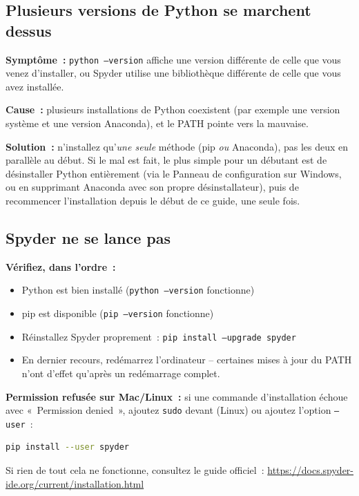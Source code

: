 \documentclass[12pt,a4paper]{article}
\begin{document}
	\subsection{Plusieurs versions de Python se marchent dessus}
	
	\textbf{Symptôme~:} \texttt{python --version} affiche une version différente de celle que vous venez d'installer, ou Spyder utilise une bibliothèque différente de celle que vous avez installée.
	
	\textbf{Cause~:} plusieurs installations de Python coexistent (par exemple une version système et une version Anaconda), et le PATH pointe vers la mauvaise.
	
	\textbf{Solution~:} n'installez qu'\emph{une seule} méthode (pip \emph{ou} Anaconda), pas les deux en parallèle au début. Si le mal est fait, le plus simple pour un débutant est de désinstaller Python entièrement (via le Panneau de configuration sur Windows, ou en supprimant Anaconda avec son propre désinstallateur), puis de recommencer l'installation depuis le début de ce guide, une seule fois.
	
	\subsection{Spyder ne se lance pas}
	
	\textbf{Vérifiez, dans l'ordre~:}
	\begin{itemize}
		\item Python est bien installé (\texttt{python --version} fonctionne)
		\item pip est disponible (\texttt{pip --version} fonctionne)
		\item Réinstallez Spyder proprement~: \texttt{pip install --upgrade spyder}
		\item En dernier recours, redémarrez l'ordinateur -- certaines mises à jour du PATH n'ont d'effet qu'après un redémarrage complet.
	\end{itemize}
	
	\textbf{Permission refusée sur Mac/Linux~:} si une commande d'installation échoue avec «~Permission denied~», ajoutez \texttt{sudo} devant (Linux) ou ajoutez l'option \texttt{--user}~:
	\begin{lstlisting}[language=bash]
		pip install --user spyder
	\end{lstlisting}
	
	Si rien de tout cela ne fonctionne, consultez le guide officiel~: \url{https://docs.spyder-ide.org/current/installation.html}
	
\end{document}
